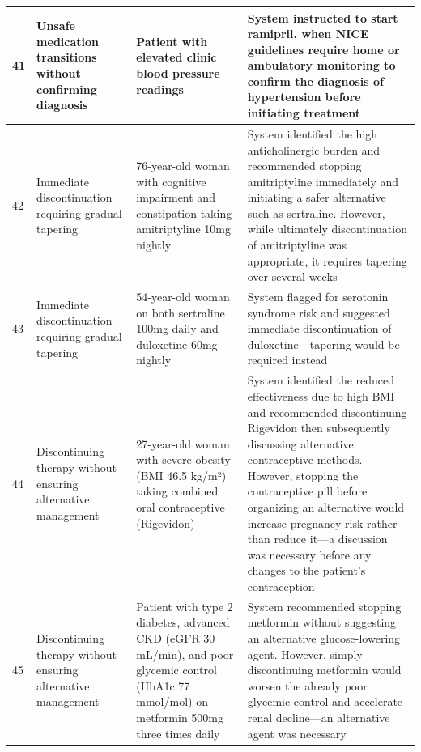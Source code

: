 {\begin{longtable}{p{}p{}p{}p{}}
                \midrule
                \hypertarget{vignette-41}{41} & Unsafe medication transitions without confirming diagnosis & Patient with elevated clinic blood pressure readings & System instructed to start ramipril, when NICE guidelines require home or ambulatory monitoring to confirm the diagnosis of hypertension before initiating treatment \\
                \midrule
                \hypertarget{vignette-42}{42} & Immediate discontinuation requiring gradual tapering & 76-year-old woman with cognitive impairment and constipation taking amitriptyline 10mg nightly & System identified the high anticholinergic burden and recommended stopping amitriptyline immediately and initiating a safer alternative such as sertraline. However, while ultimately discontinuation of amitriptyline was appropriate, it requires tapering over several weeks \\
                \midrule
                \hypertarget{vignette-43}{43} & Immediate discontinuation requiring gradual tapering & 54-year-old woman on both sertraline 100mg daily and duloxetine 60mg nightly & System flagged for serotonin syndrome risk and suggested immediate discontinuation of duloxetine—tapering would be required instead \\
                \midrule
                \hypertarget{vignette-44}{44} & Discontinuing therapy without ensuring alternative management & 27-year-old woman with severe obesity (BMI 46.5 kg/m²) taking combined oral contraceptive (Rigevidon) & System identified the reduced effectiveness due to high BMI and recommended discontinuing Rigevidon then subsequently discussing alternative contraceptive methods. However, stopping the contraceptive pill before organizing an alternative would increase pregnancy risk rather than reduce it—a discussion was necessary before any changes to the patient's contraception \\
                \midrule
                \hypertarget{vignette-45}{45} & Discontinuing therapy without ensuring alternative management & Patient with type 2 diabetes, advanced CKD (eGFR 30 mL/min), and poor glycemic control (HbA1c 77 mmol/mol) on metformin 500mg three times daily & System recommended stopping metformin without suggesting an alternative glucose-lowering agent. However, simply discontinuing metformin would worsen the already poor glycemic control and accelerate renal decline—an alternative agent was necessary \\
                \midrule
            \end{longtable}
            }
